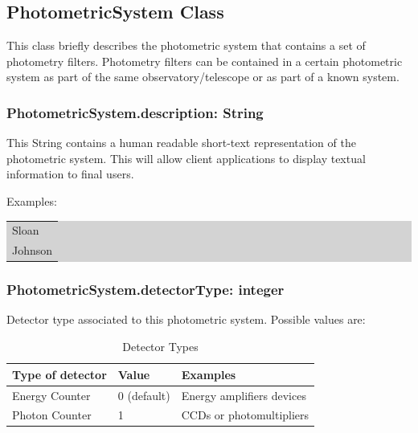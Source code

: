 \documentclass[11pt,a4paper]{ivoa}
\begin{document}
\subsection{PhotometricSystem Class}
This class briefly describes the photometric system that contains a set of photometry filters. Photometry filters can be contained in a certain photometric system as part of the same observatory/telescope or as part of a known system.
\par

\subsubsection{PhotometricSystem.description: String}
This String contains a human readable short-text representation of the photometric system. This will allow client applications to display textual information to final users.
\par

Examples: 
\par


\bigskip
\begingroup\setlength{\fboxsep}{0pt}
\colorbox{lightgray}{%
\begin{tabular}{|p{5.53in}|}

Sloan \\
Johnson
\end{tabular}%
}\endgroup
\par
\bigskip



\subsubsection{PhotometricSystem.detectorType: integer}
Detector type associated to this photometric system. Possible values are:




\begin{table}[ht]
 			\centering
\begin{tabular}{p{2.42in}p{0.8in}p{1.55in}}
\hline
\multicolumn{1}{|p{2.42in}}{Type of detector} & 
\multicolumn{1}{|p{0.8in}}{Value} & 
\multicolumn{1}{|p{1.55in}|}{Examples} \\
\hline
\multicolumn{1}{|p{2.42in}}{Energy Counter} & 
\multicolumn{1}{|p{0.8in}}{0 (default)} & 
\multicolumn{1}{|p{1.55in}|}{Energy amplifiers devices} \\
\hline
\multicolumn{1}{|p{2.42in}}{Photon Counter} & 
\multicolumn{1}{|p{0.8in}}{1} & 
\multicolumn{1}{|p{1.55in}|}{CCDs or photomultipliers} \\
\hline
\end{tabular}
\caption{Detector Types} 
 \end{table}
\end{document}
